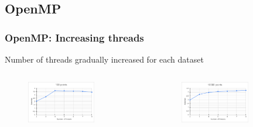 \documentclass[xcolor=table]{beamer}
\begin{document}

\subsection{OpenMP}

\begin{frame}
\frametitle{OpenMP: Increasing threads}
Number of threads gradually increased for each dataset
\vspace{0.25cm}

\begin{columns}[c]


\vspace{-0.5cm}

\begin{figure}
\includegraphics[width=0.7\textwidth]{img/chart_100_points}
\end{figure}

\vspace{-0.5cm}

\begin{figure}
\includegraphics[width=0.7\textwidth]{img/chart_10000_points}
\end{figure}


\end{columns}
\end{frame}
\end{document}
